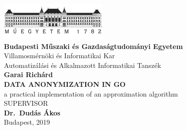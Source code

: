 \begin{titlepage}
	\begin{center}
		\includegraphics[width=0.4\textwidth]{images/bme-logo.png}\\
		\textbf{Budapesti Műszaki és Gazdaságtudományi Egyetem}\\
		Villamosmérnöki és Informatikai Kar\\
		Automatizálási és Alkalmazott Informatikai Tanszék\\
		\vspace{6cm}
		\Large \textbf{Garai Richárd}\\
		\vspace{0.2cm}
		\LARGE \MakeUppercase{\textbf{Data Anonymization in Go}}\\
		\vspace{0.1cm}
		\large a practical implementation of an approximation algorithm\\
		\vspace{5cm}
		\MakeUppercase{Supervisor}\\
		\textbf{Dr.\ Dudás Ákos}\\
        \vspace{1cm}
		Budapest, 2019
	\end{center}
 \end{titlepage}